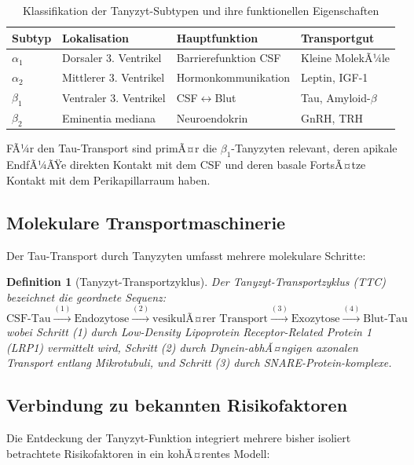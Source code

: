 ﻿\documentclass[12pt,a4paper]{article}
\newtheorem{definition}[theorem]{Definition}
\theoremstyle{definition}
\begin{document}
	\begin{table}[H]
		\centering
		\caption{Klassifikation der Tanyzyt-Subtypen und ihre funktionellen Eigenschaften}
		\label{tab:tanyzyten_klassen}
		\begin{tabular}{llll}
			\toprule
			\textbf{Subtyp} & \textbf{Lokalisation} & \textbf{Hauptfunktion} & \textbf{Transportgut} \\
			\midrule
			$\alpha_1$ & Dorsaler 3. Ventrikel & Barrierefunktion CSF & Kleine MolekÃ¼le \\
			$\alpha_2$ & Mittlerer 3. Ventrikel & Hormonkommunikation & Leptin, IGF-1 \\
			$\beta_1$  & Ventraler 3. Ventrikel & CSF$\leftrightarrow$Blut & Tau, Amyloid-$\beta$ \\
			$\beta_2$  & Eminentia mediana & Neuroendokrin & GnRH, TRH \\
			\bottomrule
		\end{tabular}
	\end{table}
	
	FÃ¼r den Tau-Transport sind primÃ¤r die $\beta_1$-Tanyzyten relevant, deren apikale EndfÃ¼ÃŸe direkten Kontakt mit dem CSF und deren basale FortsÃ¤tze Kontakt mit dem Perikapillarraum haben.
	
	\subsection{Molekulare Transportmaschinerie}
	
	Der Tau-Transport durch Tanyzyten umfasst mehrere molekulare Schritte:
	
	\begin{definition}[Tanyzyt-Transportzyklus]
		Der \emph{Tanyzyt-Transportzyklus} (TTC) bezeichnet die geordnete Sequenz:
		\[
		\text{CSF-Tau} \xrightarrow{(1)} \text{Endozytose} \xrightarrow{(2)} \text{vesikulÃ¤rer Transport} \xrightarrow{(3)} \text{Exozytose} \xrightarrow{(4)} \text{Blut-Tau}
		\]
		wobei Schritt (1) durch Low-Density Lipoprotein Receptor-Related Protein 1 (LRP1) vermittelt wird, Schritt (2) durch Dynein-abhÃ¤ngigen axonalen Transport entlang Mikrotubuli, und Schritt (3) durch SNARE-Protein-komplexe.
	\end{definition}
	
	\subsection{Verbindung zu bekannten Risikofaktoren}
	
	Die Entdeckung der Tanyzyt-Funktion integriert mehrere bisher isoliert betrachtete Risikofaktoren in ein kohÃ¤rentes Modell:
	
\end{document}
